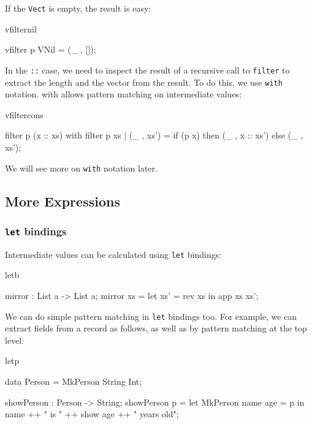 \noindent
If the \texttt{Vect} is empty, the result is easy:

\begin{SaveVerbatim}{vfilternil}

vfilter p VNil = (_ , []);

\end{SaveVerbatim}

In the \texttt{::} case, we need to inspect the result of a recursive call to 
\texttt{filter} to
extract the length and the vector from the result. To do this, we use \texttt{with}
notation. with allows pattern matching on intermediate values:

\begin{SaveVerbatim}{vfiltercons}

filter p (x :: xs) with filter p xs {
   | (_ , xs') = if (p x) then (_ , x :: xs') else (_ , xs');
}

\end{SaveVerbatim}

\noindent
We will see more on \texttt{with} notation later.

\subsection{More Expressions}

\subsubsection*{\texttt{let} bindings}

Intermediate values can be calculated using \texttt{let} bindings:

\begin{SaveVerbatim}{letb}

mirror : List a -> List a;
mirror xs = let xs' = rev xs in
                app xs xs';

\end{SaveVerbatim}

\noindent
We can do simple pattern matching in \texttt{let} bindings too. For example, we can extract
fields from a record as follows, as well as by pattern matching at the top level:

\begin{SaveVerbatim}{letp}

data Person = MkPerson String Int;

showPerson : Person -> String;
showPerson p = let MkPerson name age = p in
                   name ++ " is " ++ show age ++ " years old";

\end{SaveVerbatim}


